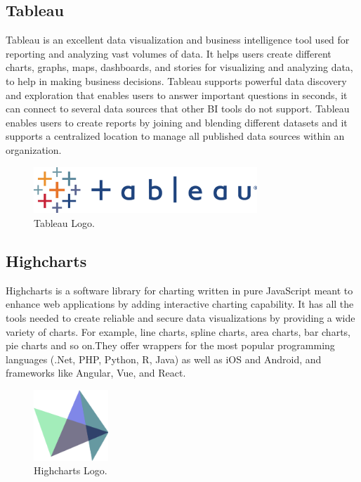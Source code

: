 \subsection{Tableau}
\label{sec:tableau}
Tableau is an excellent data visualization and business intelligence tool used for reporting and analyzing vast volumes of data. It helps users create different charts, graphs, maps, dashboards, and stories for visualizing and analyzing data, to help in making business decisions. Tableau supports powerful data discovery and exploration that enables users to answer important questions in seconds, it can connect to several data sources that other BI tools do not support. Tableau enables users to create reports by joining and blending different datasets and it supports a centralized location to manage all published data sources within an organization\cite{WhatTableauUltimate}.
\begin{figure}[h!]
    \center
    \includegraphics[width=0.75\textwidth]{images/chapter4/TableauLogo.png}
    \caption{Tableau Logo.}
    \label{fig:tableau}
\end{figure}
\subsection{Highcharts}
Highcharts is a software library for charting written in pure JavaScript meant to enhance web applications by adding interactive charting capability. 
It has all the tools needed to create reliable and secure data visualizations by
providing a wide variety of charts. For example, line charts, spline charts, area charts, bar charts, pie charts and so on.They offer wrappers for the most popular programming languages (.Net, PHP, Python, R, Java) as well as iOS and Android, and frameworks like Angular, Vue, and React\cite{InteractiveJavascriptCharts}.
\begin{figure}[h!]
    \center
    \includegraphics[width=0.25\textwidth]{images/chapter4/highchart.png}
    \caption{Highcharts Logo.}
    \label{fig:Highcharts}
\end{figure}

